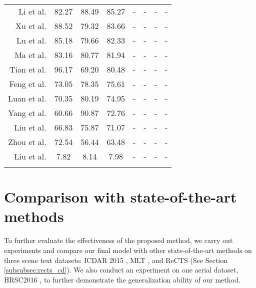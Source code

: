 \begin{table*}
\begin{tabular}{ r |ccc|cccc}
        Li et al.& 82.27  & 88.49 & 85.27& -  & - & -  & - \\
        Xu et al.& 88.52  & 79.32 & 83.66& -  & - & -  & - \\
        Lu et al.& 85.18  & 79.66 & 82.33& -  & - & -  & - \\
        Ma et al.& 83.16  & 80.77 & 81.94& -  & - & -  & - \\
        Tian et al.& 96.17  & 69.20 & 80.48& -  & - & -  & - \\
        Feng et al.& 73.05  & 78.35 & 75.61& -  & - & -  & - \\
        Luan et al.& 70.35  & 80.19 & 74.95& -  & - & -  & - \\
        Yang et al.& 60.66  & 90.87 & 72.76& -  & - & -  & - \\
        Liu et al.& 66.83  & 75.87  & 71.07& -  & - & -  & - \\
        Zhou et al.& 72.54  & 56.44 & 63.48& -  & -& -  & - \\
        Liu et al.& 7.82  & 8.14 & 7.98& -  & - & -  & - \\
        \noalign{\smallskip}\hline
        \end{tabular}
    \end{table*} 
  
  \section{Comparison with state-of-the-art methods}
  To further evaluate the effectiveness of the proposed method, we carry out experiments and compare our final model with other state-of-the-art methods on three scene text datasets: ICDAR 2015 \cite{karatzas2015icdar}, MLT \cite{nayef2017icdar2017}, and ReCTS (See Section \ref{subsubsec:rects_cd}). We also conduct an experiment on one aerial dataset, HRSC2016 \cite{liu2017rotated}, to further demonstrate the generalization ability of our method.
  
